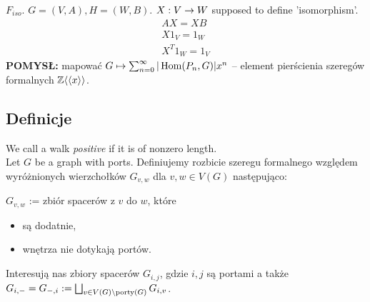 \begin{df}
	$F_{iso}$. $G = (V, A), H = (W, B).$  $X:V \rightarrow W$ supposed to define 'isomorphism'.
	\begin{align*}
	AX = XB\\
	X1_V = 1_W\\
	X^T1_W = 1_V
	\end{align*}
\textbf{POMYSŁ: }mapować $G \mapsto \sum_{n = 0} ^ {\infty} |\operatorname{Hom}(P_n, G)| x^n$ -- element pierścienia szeregów formalnych $ \mathbb{ Z } \langle\langle x \rangle\rangle $.
 
\subsection{Definicje}
	We call a walk \emph{positive} if it is of nonzero length.\\
	Let $G$ be a graph with ports. Definiujemy rozbicie szeregu formalnego względem wyróżnionych wierzchołków $G_{v,w}$ dla $v,w \in V(G)$ następująco: 
	
	$G_{v,w}$ :=  zbiór spacerów z $v$ do $w$, które
	\begin{itemize}
		\item są dodatnie,
		\item wnętrza nie dotykają portów.
	\end{itemize}

	Interesują nas zbiory spacerów $G_{i, j}$, gdzie $i, j$ są portami a także $G_{i, -} = G_{-, i} := \bigsqcup_{v \in V(G) \setminus \operatorname{porty}(G)} G_{i, v}$.


\end{df}
